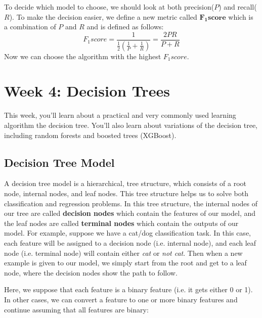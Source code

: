 \documentclass[a4paper, 12pt]{book}
\begin{document}
\begin{center}
\end{center}
To decide which model to choose, we should look at both precision($P$) and recall($R$). To make the decision easier, we define a new metric called $\mathbf{F_1 score}$ which is a combination of $P$ and $R$ and is defined as follows:
\[F_1 score = \frac{1}{\frac{1}{2}(\frac{1}{P}+\frac{1}{R})} = \frac{2PR}{P+R}\]
Now we can choose the algorithm with the highest $F_1 score$.

\section{Week 4: Decision Trees}

This week, you'll learn about a practical and very commonly used learning algorithm the decision tree. You'll also learn about variations of the decision tree, including random forests and boosted trees (XGBoost).

\subsection{Decision Tree Model}

A decision tree model is a hierarchical, tree structure, which consists of a root node, internal nodes, and leaf nodes. This tree structure helps us to solve both classification and regression problems. In this tree structure, the internal nodes of our tree are called \textbf{decision nodes} which contain the features of our model, and the leaf nodes are called \textbf{terminal nodes} which contain the outputs of our model. For example, suppose we have a cat/dog classification task. In this case, each feature will be assigned to a decision node (i.e. internal node), and each leaf node (i.e. terminal node) will contain either \emph{cat} or \emph{not cat}. Then when a new example is given to our model, we simply start from the root and get to a leaf node, where the decision nodes show the path to follow.

Here, we suppose that each feature is a binary feature (i.e. it gets either 0 or 1). In other cases, we can convert a feature to one or more binary features and continue assuming that all features are binary:
\end{document}
